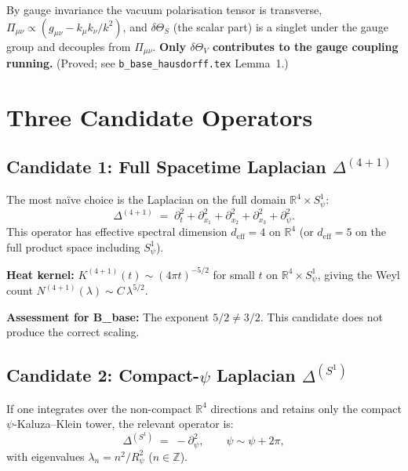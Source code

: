 \documentclass[11pt,a4paper]{article}
\theoremstyle{definition}
\theoremstyle{remark}
\begin{document}
By gauge invariance the vacuum polarisation tensor is transverse,
$\Pi_{\mu\nu} \propto (g_{\mu\nu} - k_\mu k_\nu/k^2)$, and
$\delta\Theta_S$ (the scalar part) is a singlet under the gauge group and
decouples from $\Pi_{\mu\nu}$.
\textbf{Only $\delta\Theta_V$ contributes to the gauge coupling running.}
(Proved; see \texttt{b\_base\_hausdorff.tex} Lemma~1.)

\section{Three Candidate Operators}
\label{sec:candidates}

\subsection{Candidate 1: Full Spacetime Laplacian $\Delta^{(4+1)}$}
\label{sec:cand1}

The most na\"ive choice is the Laplacian on the full domain
$\mathbb{R}^4 \times S^1_\psi$:
\begin{equation}
  \Delta^{(4+1)} \;=\; \partial_t^2 + \partial_{x_1}^2 + \partial_{x_2}^2
    + \partial_{x_3}^2 + \partial_\psi^2.
  \label{eq:Delta_41}
\end{equation}
This operator has effective spectral dimension $d_{\mathrm{eff}} = 4$
on $\mathbb{R}^4$ (or $d_{\mathrm{eff}} = 5$ on the full product space
including $S^1_\psi$).

\textbf{Heat kernel:} $K^{(4+1)}(t) \sim (4\pi t)^{-5/2}$ for small $t$
on $\mathbb{R}^4 \times S^1_\psi$, giving the Weyl count
$N^{(4+1)}(\lambda) \sim C\,\lambda^{5/2}$.

\textbf{Assessment for B\_base:} The exponent $5/2 \neq 3/2$.
This candidate does not produce the correct scaling.

\subsection{Candidate 2: Compact-$\psi$ Laplacian $\Delta^{(S^1)}$}
\label{sec:cand2}

If one integrates over the non-compact $\mathbb{R}^4$ directions and retains
only the compact $\psi$-Kaluza–Klein tower, the relevant operator is:
\begin{equation}
  \Delta^{(S^1)} \;=\; -\partial_\psi^2,
  \qquad \psi \sim \psi + 2\pi,
  \label{eq:Delta_S1}
\end{equation}
with eigenvalues $\lambda_n = n^2/R_\psi^2$ ($n \in \mathbb{Z}$).
\end{document}
